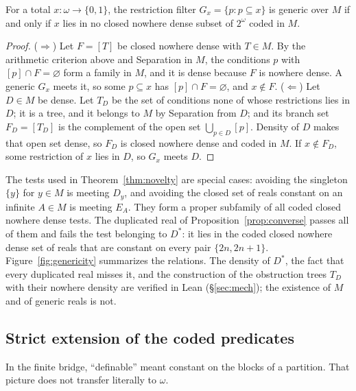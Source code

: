 \begin{theorem}\label{thm:recognition}
For a total $x\colon\omega\to\{0,1\}$, the restriction filter $G_x=\{p:p\subseteq x\}$ is generic
over $M$ if and only if $x$ lies in no closed nowhere dense subset of $2^\omega$ coded in $M$.
\end{theorem}

\begin{proof}
($\Rightarrow$) Let $F=[T]$ be closed nowhere dense with $T\in M$. By the arithmetic criterion
above and Separation in $M$, the conditions $p$ with $[p]\cap F=\varnothing$ form a family in $M$,
and it is dense because $F$ is nowhere dense. A
generic $G_x$ meets it, so some $p\subseteq x$ has $[p]\cap F=\varnothing$, and $x\notin F$.
($\Leftarrow$) Let $D\in M$ be dense. Let $T_D$ be the set of conditions none of whose restrictions
lies in $D$; it is a tree, and it belongs to $M$ by Separation from $D$; and its branch set $F_D=[T_D]$ is the complement of the open set
$\bigcup_{p\in D}[p]$. Density of $D$ makes that open set dense, so $F_D$ is closed nowhere dense
and coded in $M$. If $x\notin F_D$, some restriction of $x$ lies in $D$, so $G_x$ meets $D$.
\end{proof}

The tests used in Theorem~\ref{thm:novelty} are special cases: avoiding the singleton $\{y\}$ for
$y\in M$ is meeting $D_y$, and avoiding the closed set of reals constant on an infinite $A\in M$ is
meeting $E_A$. They form a proper subfamily of all coded closed nowhere dense tests. The
duplicated real of Proposition~\ref{prop:converse} passes all of them and fails the test
belonging to $D^\ast$: it lies in the coded closed nowhere dense set of reals that are constant on
every pair $\{2n,2n+1\}$. Figure~\ref{fig:genericity} summarizes the relations. The density of
$D^\ast$, the fact that every duplicated real misses it, and the construction of the obstruction
trees $T_D$ with their nowhere density are verified in Lean (\S\ref{sec:mech}); the existence of $M$
and of generic reals is not.



\subsection{Strict extension of the coded predicates}\label{ssec:strict}

In the finite bridge, ``definable'' meant constant on the blocks of a partition. That picture
does not transfer literally to $\omega$.

